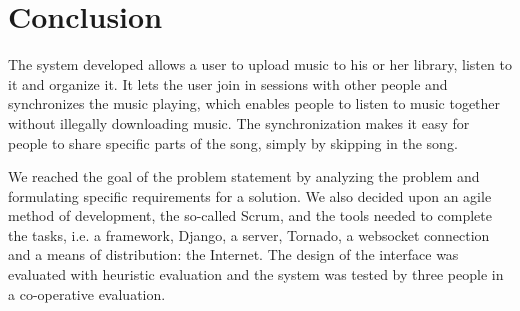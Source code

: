\section{Conclusion}
The system developed allows a user to upload music to his or her library, listen to it and organize it. It lets the user join
in sessions with other people and synchronizes the music playing, which enables people to listen to music together without
illegally downloading music. The synchronization makes it easy for people to share specific parts of the song, simply by
skipping in the song. 

We reached the goal of the problem statement by analyzing the problem and formulating specific requirements for a solution. We
also decided upon an agile method of development, the so-called Scrum, and the tools needed to complete the tasks, i.e. a
framework, Django, a server, Tornado, a websocket connection and a means of distribution: the Internet. The design of the
interface was evaluated with heuristic evaluation and the system was tested by three people in a co-operative evaluation. 